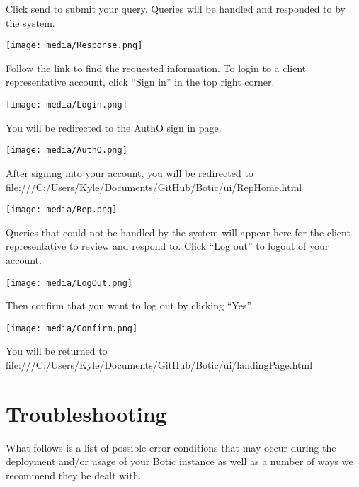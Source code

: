 \documentclass[11pt]{article}
\begin{document}
\begin{flushleft}
	Click send to submit your query. Queries will be handled and responded to by the system.
\end{flushleft}
\texttt{[image: media/Response.png]}

\begin{flushleft}
	Follow the link to find the requested information.
	To login to a client representative account, click “Sign in” in the top right corner.
\end{flushleft}
\texttt{[image: media/Login.png]}

\begin{flushleft}
	You will be redirected to the AuthO sign in page.
\end{flushleft}
\texttt{[image: media/AuthO.png]}

\begin{flushleft}
	After signing into your account, you will be redirected to file:///C:/Users/Kyle/Documents/GitHub/Botic/ui/RepHome.html
\end{flushleft}
\texttt{[image: media/Rep.png]}

\begin{flushleft}
	Queries that could not be handled by the system will appear here for the client representative to review and respond to.
	Click “Log out” to logout of your account.
\end{flushleft}
\texttt{[image: media/LogOut.png]}

\begin{flushleft}
	Then confirm that you want to log out by clicking “Yes”.
\end{flushleft}
\texttt{[image: media/Confirm.png]}

\begin{flushleft}
You will be returned to file:///C:/Users/Kyle/Documents/GitHub/Botic/ui/landingPage.html
\end{flushleft}

\section{Troubleshooting}
What follows is a list of possible error conditions that may occur during the deployment and/or usage of your Botic instance as well as a number of ways we recommend they be dealt with.
\end{document}
